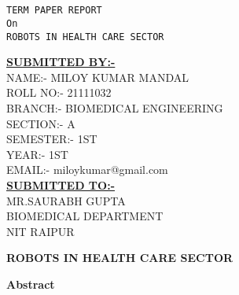 \documentclass[12pt,a4paper]{report}
\begin{document}
 


\begin{center}
    \Large{}\\
\end{center}

\begin{center}
    \Large{}\\ 
\end{center}



\begin{center}
   \huge{\texttt{TERM PAPER REPORT\\On\\ROBOTS IN HEALTH CARE SECTOR}}
  \end{center}
 
  
\begin{center}
\textbf{\underline{SUBMITTED BY:-}}\\

NAME:- MILOY KUMAR MANDAL\\
ROLL NO:- 21111032\\
BRANCH:- BIOMEDICAL ENGINEERING\\
SECTION:- A\\
SEMESTER:- 1ST\\
YEAR:- 1ST\\
EMAIL:- miloykumar@gmail.com\\

\textbf{\underline{SUBMITTED TO:-}}\\
MR.SAURABH GUPTA\\
BIOMEDICAL DEPARTMENT\\
NIT RAIPUR\\


 
\end{center} 
\clearpage

\begin{center}
  \huge{\textbf{ROBOTS IN HEALTH CARE SECTOR}}
\end{center}

\begin{center}
  \small{\textbf{Abstract}}
\end{center}
\end{document}
